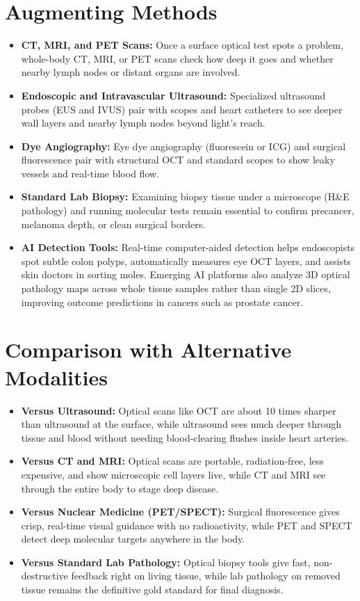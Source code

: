 \section{Augmenting Methods}
\begin{itemize}
  \item \textbf{CT, MRI, and PET Scans:} Once a surface optical test spots a problem, whole-body CT, MRI, or PET scans check how deep it goes and whether nearby lymph nodes or distant organs are involved.
  \item \textbf{Endoscopic and Intravascular Ultrasound:} Specialized ultrasound probes (EUS and IVUS) pair with scopes and heart catheters to see deeper wall layers and nearby lymph nodes beyond light's reach.
  \item \textbf{Dye Angiography:} Eye dye angiography (fluorescein or ICG) and surgical fluorescence pair with structural OCT and standard scopes to show leaky vessels and real-time blood flow.
  \item \textbf{Standard Lab Biopsy:} Examining biopsy tissue under a microscope (H\&E pathology) and running molecular tests remain essential to confirm precancer, melanoma depth, or clean surgical borders.
  \item \textbf{AI Detection Tools:} Real-time computer-aided detection helps endoscopists spot subtle colon polyps, automatically measures eye OCT layers, and assists skin doctors in sorting moles. Emerging AI platforms also analyze 3D optical pathology maps across whole tissue samples rather than single 2D slices, improving outcome predictions in cancers such as prostate cancer.
\end{itemize}

\section{Comparison with Alternative Modalities}
\begin{itemize}
  \item \textbf{Versus Ultrasound:} Optical scans like OCT are about 10 times sharper than ultrasound at the surface, while ultrasound sees much deeper through tissue and blood without needing blood-clearing flushes inside heart arteries.
  \item \textbf{Versus CT and MRI:} Optical scans are portable, radiation-free, less expensive, and show microscopic cell layers live, while CT and MRI see through the entire body to stage deep disease.
  \item \textbf{Versus Nuclear Medicine (PET/SPECT):} Surgical fluorescence gives crisp, real-time visual guidance with no radioactivity, while PET and SPECT detect deep molecular targets anywhere in the body.
  \item \textbf{Versus Standard Lab Pathology:} Optical biopsy tools give fast, non-destructive feedback right on living tissue, while lab pathology on removed tissue remains the definitive gold standard for final diagnosis.
\end{itemize}

